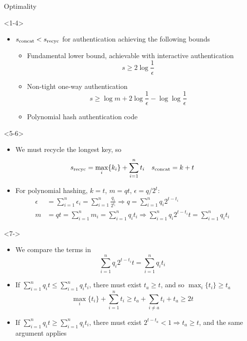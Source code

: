 \documentclass[xcolor=dvipsnames]{beamer}
\newcommand{\?}{\mathrel{?}} %
\begin{document}
\begin{frame}{Optimality}
  \begin{onlyenv}<1-4>
    \begin{itemize}[<+->]
      \item \(s_{\rm concat} < s_{\rm recyc}\) for authentication achieving the following bounds
        \begin{itemize}
          \item Fundamental lower bound, achievable with interactive authentication
            \[ s \geq 2 \log \frac{1}{\epsilon} \]
          \item Non-tight one-way authentication
            \[ s \geq \log m + 2 \log \frac{1}{\epsilon} - \log \log \frac{1}{\epsilon} \]
          \item Polynomial hash authentication code
        \end{itemize}
    \end{itemize}
  \end{onlyenv}
  \begin{onlyenv}<5-6>
    \begin{itemize}[<+->]
      \item We must recycle the longest key, so
        \[ s_{\rm recyc} = \max_i \{k_i\} + \sum_{i=1}^n t_i \quad s_{\rm concat} = k + t \]
      \item For polynomial hashing, \(k = t\), \(m = qt\), \(\epsilon = q/2^t\):
        \begin{align*}
          \epsilon &= \sum_{i=1}^n \epsilon_i = \sum_{i=1}^n \frac{q_i}{2^{t_i}} \Rightarrow q = \sum_{i=1}^n q_i 2^{t-t_i} \\
          m &= qt = \sum_{i=1}^n m_i = \sum_{i=1}^n q_i t_i \Rightarrow \sum_{i=1}^n q_i 2^{t-t_i} t = \sum_{i=1}^n q_i t_i
        \end{align*}
    \end{itemize}
  \end{onlyenv}
  \begin{onlyenv}<7->
    \begin{itemize}[<+->]
      \item We compare the terms in \[ \sum_{i=1}^n q_i 2^{t-t_i} t = \sum_{i=1}^n q_i t_i \]
      \item If \(\sum_{i=1}^n q_i t \leq \sum_{i=1}^n q_i t_i\), there must exist \(t_a \geq t\), and so \(\max_i \{t_i\} \geq t_a\)
        \[ \max_i \{t_i\} + \sum_{i=1}^n t_i \geq t_a + \sum_{i \neq a} t_i + t_a \geq 2t \]
      \item If \(\sum_{i=1}^n q_i t \geq \sum_{i=1}^n q_i t_i\), there must exist \(2^{t-t_a} < 1 \Rightarrow t_a \geq t\), and the same argument applies
    \end{itemize}
  \end{onlyenv}
\end{frame}
\end{document}
